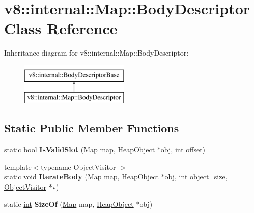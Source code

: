 \hypertarget{classv8_1_1internal_1_1Map_1_1BodyDescriptor}{}\section{v8\+:\+:internal\+:\+:Map\+:\+:Body\+Descriptor Class Reference}
\label{classv8_1_1internal_1_1Map_1_1BodyDescriptor}
Inheritance diagram for v8\+:\+:internal\+:\+:Map\+:\+:Body\+Descriptor\+:\begin{figure}[H]
\begin{center}
\leavevmode
\includegraphics[height=2.000000cm]{classv8_1_1internal_1_1Map_1_1BodyDescriptor}
\end{center}
\end{figure}
\subsection*{Static Public Member Functions}
\begin{DoxyCompactItemize}
\item 
\mbox{\label{classv8_1_1internal_1_1Map_1_1BodyDescriptor_a5ce2a5669133e991ff4441dd0e3e72b4}} 
static \mbox{\hyperlink{classbool}{bool}} {\bfseries Is\+Valid\+Slot} (\mbox{\hyperlink{classv8_1_1internal_1_1Map}{Map}} map, \mbox{\hyperlink{classv8_1_1internal_1_1HeapObject}{Heap\+Object}} $\ast$obj, \mbox{\hyperlink{classint}{int}} offset)
\item 
\mbox{\label{classv8_1_1internal_1_1Map_1_1BodyDescriptor_ac5c408d56ec0b6c0daa0cfcbf6c19cee}} 
{\footnotesize template$<$typename Object\+Visitor $>$ }\\static void {\bfseries Iterate\+Body} (\mbox{\hyperlink{classv8_1_1internal_1_1Map}{Map}} map, \mbox{\hyperlink{classv8_1_1internal_1_1HeapObject}{Heap\+Object}} $\ast$obj, \mbox{\hyperlink{classint}{int}} object\+\_\+size, \mbox{\hyperlink{classv8_1_1internal_1_1ObjectVisitor}{Object\+Visitor}} $\ast$v)
\item 
\mbox{\label{classv8_1_1internal_1_1Map_1_1BodyDescriptor_a60d75d0f9de68c7567483ad41af6f55c}} 
static \mbox{\hyperlink{classint}{int}} {\bfseries Size\+Of} (\mbox{\hyperlink{classv8_1_1internal_1_1Map}{Map}} map, \mbox{\hyperlink{classv8_1_1internal_1_1HeapObject}{Heap\+Object}} $\ast$obj)
\end{DoxyCompactItemize}
